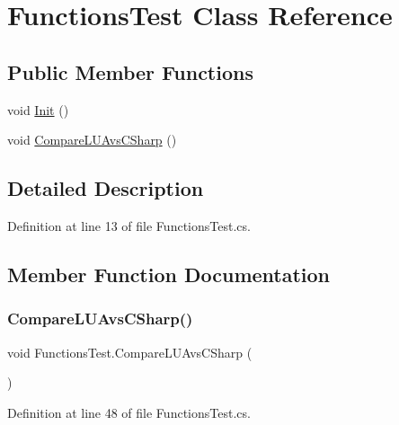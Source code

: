 \hypertarget{class_functions_test}{}\section{Functions\+Test Class Reference}
\label{class_functions_test}
\subsection*{Public Member Functions}
\begin{DoxyCompactItemize}
\item 
void \hyperlink{class_functions_test_a10e12133c308c23ec76fc9ab57c4b843}{Init} ()
\item 
void \hyperlink{class_functions_test_ad7dfae26ce9c0736d1611da219842359}{Compare\+L\+U\+Avs\+C\+Sharp} ()
\end{DoxyCompactItemize}


\subsection{Detailed Description}


Definition at line 13 of file Functions\+Test.\+cs.



\subsection{Member Function Documentation}
\mbox{\label{class_functions_test_ad7dfae26ce9c0736d1611da219842359}} 
\subsubsection{\texorpdfstring{Compare\+L\+U\+Avs\+C\+Sharp()}{CompareLUAvsCSharp()}}
{\footnotesize\ttfamily void Functions\+Test.\+Compare\+L\+U\+Avs\+C\+Sharp (\begin{DoxyParamCaption}{ }\end{DoxyParamCaption})}



Definition at line 48 of file Functions\+Test.\+cs.

\mbox{\label{class_functions_test_a10e12133c308c23ec76fc9ab57c4b843}} 
